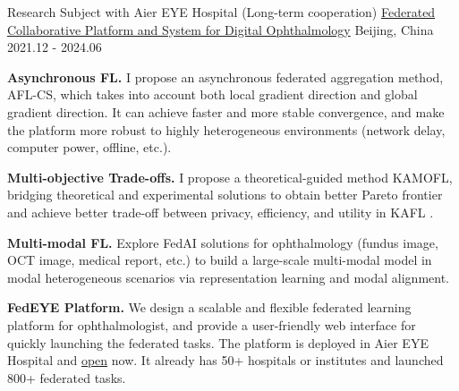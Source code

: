 \begin{cventries}
\cventry
{Research Subject with Aier EYE Hospital (Long-term cooperation)} %
{\href{https://fedeye.aierchina.com/}{Federated Collaborative Platform and System for Digital Ophthalmology}} %
{Beijing, China} %
{2021.12 - 2024.06} %
{
    \begin{cvitems}
        \item {\textbf{Asynchronous FL.} I propose an asynchronous federated aggregation method, AFL-CS, which takes into account both local gradient direction and global gradient direction. It can achieve faster and more stable convergence, and make the platform more robust to highly heterogeneous environments (network delay, computer power, offline, etc.).}
        \item {\textbf{Multi-objective Trade-offs.} I propose a theoretical-guided method KAMOFL, bridging theoretical and experimental solutions to obtain better Pareto frontier and achieve better trade-off between privacy, efficiency, and utility in KAFL .}
        \item {\textbf{Multi-modal FL.} Explore FedAI solutions for ophthalmology (fundus image, OCT image, medical report, etc.) to build a large-scale multi-modal model in modal heterogeneous scenarios via representation learning and modal alignment.}
        \item {\textbf{FedEYE Platform.} We design a scalable and flexible federated learning platform for ophthalmologist, 
            and provide a user-friendly web interface for quickly launching the federated tasks. 
            The platform is deployed in Aier EYE Hospital and \textcolor{awesome-red}{\href{https://fedeye.aierchina.com/}{open}} now. 
            It already has \textcolor{awesome-red}{50+} hospitals or institutes and launched \textcolor{awesome-red}{800+} federated tasks.}
    \end{cvitems}
}


\end{cventries}
